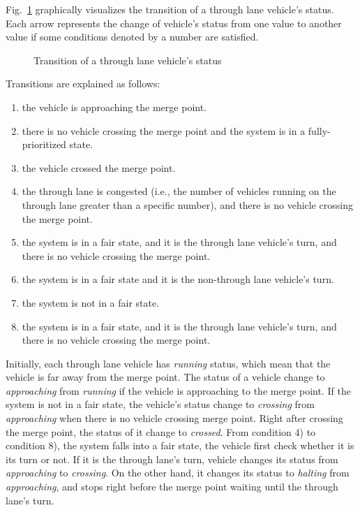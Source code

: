 \documentclass[10pt, conference, compsocconf]{IEEEtran}
\begin{document}
Fig.~\ref{throughLaneStatus} graphically visualizes the transition of a through lane vehicle's status.
Each arrow represents the change of vehicle's status from one value to another value if some conditions denoted by a number are satisfied.

\begin{figure}[h]
\begin{center}
\end{center}
\caption{Transition of a through lane vehicle's status}
\label{throughLaneStatus}
\end{figure}

Transitions are explained as follows:
\begin{enumerate}[]
    \item the vehicle is approaching the merge point. %
    \item there is no vehicle crossing the merge point and the system is in a fully-prioritized state. %
    \item the vehicle crossed the merge point. %
    \item the through lane is congested (i.e., the number of vehicles running on the through lane greater than a specific number), and there is no vehicle crossing the merge point.  %
    \item the system is in a fair state, and it is the through lane vehicle's turn, and there is no vehicle crossing the merge point. %
    \item the  system is in a fair state and it is the non-through lane vehicle's turn. %
    \item the  system is not in a fair state. %
    \item the system is in a fair state, and it is the through lane vehicle's turn, and there is no vehicle crossing the merge point. %
\end{enumerate}

Initially, each through lane vehicle has \textit{running} status, which mean that the vehicle is far away from the merge point.
The status of a vehicle change to \textit{approaching} from \textit{running} if the vehicle is approaching to the merge point.
If the system is not in a fair state, the vehicle's status change to \textit{crossing} from \textit{approaching} when there is no vehicle crossing merge point. 
Right after crossing the merge point, the status of it change to \textit{crossed}. 
From condition 4) to condition 8), the system falls into a fair state, the vehicle first check whether it is its turn or not. 
If it is the through lane's turn, vehicle changes its status from \textit{approaching} to \textit{crossing}. 
On the other hand, it changes its status to \textit{halting} from \textit{approaching}, and stops right before the merge point waiting until the through lane's turn.
\end{document}

